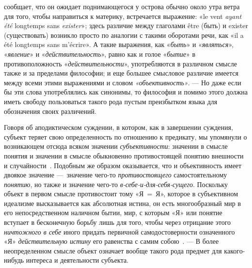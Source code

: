 \documentclass[twoside]{article}
\begin{document}
{{{{{{{сообщает, что он ожидает поднимающегося у острова обычно около утра ветра
для того, чтобы направиться к материку, встречается выражение: «le vent
{\em ayant été} longtemps sans
{\em exister}»\label{bkm:bm64};
здесь различие между глаголами être (быть) и
exister (существовать) возникло просто по аналогии с такими
оборотами речи, как «il a été longtemps sans
m'écrire»\label{bkm:bm65}.}
А такие выражения, как
«{\em быть}» и
«{\em являться}»,
«{\em явление}» и
«{\em действительность}»,
равно как и голое
«{\em бытие}» в
противоположность
«{\em действительности}»,
употребляются в различном смысле также и за пределами
философии; и еще большее смысловое различие имеется между всеми этими
выражениями и словом
{\em «объективность»}. —
Но даже если бы эти слова употреблялись как синонимы, то
философия и помимо этого должна иметь свободу пользоваться такого рода
пустым преизбытком языка для обозначения своих различений.

Говоря об аподиктическом суждении, в котором, как в завершении
суждения, субъект теряет свою определенность по отношению к предикату, мы
упомянули о возникающем отсюда всяком значении
{\em субъективности}:
значении в смысле понятия и значении в смысле обыкновенно
противостоящей понятию внешности и
случайности~\label{bkm:bm66}.
Подобным же образом оказывается, что и объективность имеет
двоякое значение —~значение чего-то
{\em противостоящего}
самостоятельному
{\em понятию}, но также и
значение чего-то
{\em в-себе-и-для-себя-сущего}.
Поскольку объект в первом смысле противостоит тому «Я~=~Я»,
которое в субъективном идеализме высказывается как абсолютная истина, он
есть многообразный мир в его непосредственном наличном
бытии, мир, с которым «Я» или понятие вступает в бесконечную борьбу лишь
для того, чтобы через отрицание этого
{\em ничтожного в себе}
иного придать первичной самодостоверности означенного «Я»
{\em действительную истину}
его равенства с самим
собою~\label{bkm:bm67}.
— В более неопределенном смысле объект означает вообще такого
рода предмет для какого-нибудь интереса и деятельности субъекта.

}}}}}}
\end{document}
